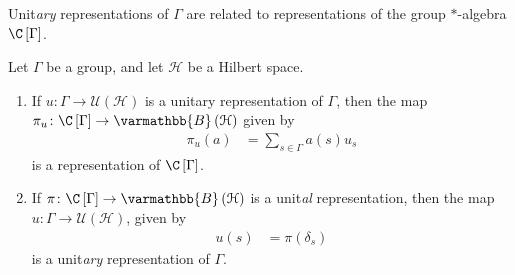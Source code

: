 \documentclass[10pt]{mypackage}
\renewcommand*{\mathbb}[1]{\varmathbb{#1}}
\newcommand{\B}{\mathbb{B}}
\begin{document}
Unit\textit{ary} representations of $\Gamma$ are related to representations of the group $\ast$-algebra $\C\left[\Gamma\right]$.
\begin{proposition}
  Let $\Gamma$ be a group, and let $\mathcal{H}$ be a Hilbert space.
  \begin{enumerate}[(1)]
    \item If $u\colon \Gamma\rightarrow \mathcal{U}\left(\mathcal{H}\right)$ is a unitary representation of $\Gamma$, then the map $\pi_u\colon \C\left[\Gamma\right]\rightarrow \B\left(\mathcal{H}\right)$ given by
      \begin{align*}
        \pi_u\left(a\right) &= \sum_{s\in \Gamma}a(s)u_s
      \end{align*}
      is a representation of $\C\left[\Gamma\right]$.
    \item If $\pi\colon \C\left[\Gamma\right] \rightarrow \B\left(\mathcal{H}\right)$ is a unit\textit{al} representation, then the map $u\colon \Gamma\rightarrow \mathcal{U}\left(\mathcal{H}\right)$, given by
      \begin{align*}
        u(s) &= \pi\left(\delta_s\right)
      \end{align*}
      is a unit\textit{ary} representation of $\Gamma$.
  \end{enumerate}
\end{proposition}
\end{document}
